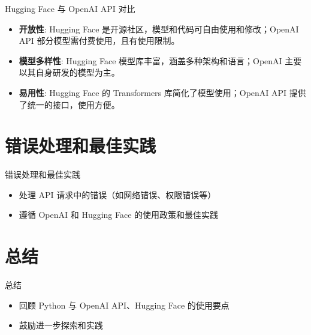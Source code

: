 \begin{frame}{Hugging Face 与 OpenAI API 对比}
    \begin{itemize}
        \item \textbf{开放性}: Hugging Face 是开源社区，模型和代码可自由使用和修改；OpenAI API 部分模型需付费使用，且有使用限制。
        \item \textbf{模型多样性}: Hugging Face 模型库丰富，涵盖多种架构和语言；OpenAI 主要以其自身研发的模型为主。
        \item \textbf{易用性}: Hugging Face 的 Transformers 库简化了模型使用；OpenAI API 提供了统一的接口，使用方便。
    \end{itemize}
\end{frame}

\section{错误处理和最佳实践}
\begin{frame}{错误处理和最佳实践}
    \begin{itemize}
        \item 处理 API 请求中的错误（如网络错误、权限错误等）
        \item 遵循 OpenAI 和 Hugging Face 的使用政策和最佳实践
    \end{itemize}
\end{frame}

\section{总结}
\begin{frame}{总结}
    \begin{itemize}
        \item 回顾 Python 与 OpenAI API、Hugging Face 的使用要点
        \item 鼓励进一步探索和实践
    \end{itemize}
\end{frame}
